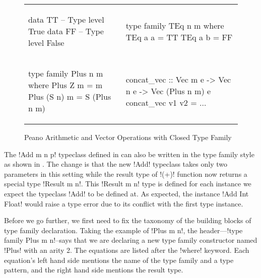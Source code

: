 \documentclass[format=sigplan,manuscript,review,screen,nonacm,margin=1in]{acmart}
\begin{document}
\begin{figure}[ht]
  \begin{tabular}{l l}
\begin{code}
data TT -- Type level True
data FF -- Type level False
\end{code}&%
\begin{code}
type family TEq n m where
  TEq a a = TT
  TEq a b = FF
\end{code}\\
\begin{code}
type family Plus n m where
Plus Z     m = m
Plus (S n) m = S (Plus n m)
\end{code}&%
\begin{code}
concat_vec :: Vec m e -> Vec n e -> Vec (Plus n m) e
concat_vec v1 v2 = $\ldots$
\end{code}
  \end{tabular}
  \caption{Peano Arithmetic and Vector Operations with Closed Type Family}
  \label{fig:plus-ty-fam}
\end{figure}
The !Add m n p! typeclass defined in  can also be written in
the type family style as shown in . The change is that the new 
!Add! typeclass takes only two parameters in this setting while the result type
of !(+)! function now returns a special type !Result m n!. This !Result m n! type is defined
for each instance we expect the typeclass !Add! to be defined at.
As expected, the instance !Add Int Float! would raise a type error due to its conflict with
the first type instance. 

Before we go further, we first need to fix the taxonomy of the building blocks of type family declaration.
Taking the example of !Plus m n!, the header---!type family Plus m n!--says that we are
declaring a new type family constructor named !Plus! with an arity 2. The equations
are listed after the !where! keyword. Each equation's left hand side mentions
the name of the type family and a type pattern, and the right hand side mentions the result type.
\end{document}
